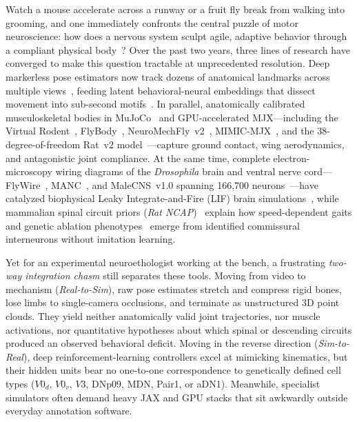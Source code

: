 \documentclass[10pt,twocolumn,letterpaper]{article}
\begin{document}
Watch a mouse accelerate across a runway or a fruit fly break from walking into grooming, and one immediately confronts the central puzzle of motor neuroscience: how does a nervous system sculpt agile, adaptive behavior through a compliant physical body~\cite{krakauer2017neuroscience,datta2019computational}? Over the past two years, three lines of research have converged to make this question tractable at unprecedented resolution. Deep markerless pose estimators now track dozens of anatomical landmarks across multiple views~\cite{mathis2018deeplabcut,pereira2022sleap,dunn2021dannce,karashchuk2021anipose}, feeding latent behavioral-neural embeddings that dissect movement into sub-second motifs~\cite{weinreb2024keypointmoseq,schneider2023cebra}. In parallel, anatomically calibrated musculoskeletal bodies in MuJoCo~\cite{todorov2012mujoco} and GPU-accelerated MJX---including the Virtual Rodent~\cite{aldarondo2024virtualrodent}, FlyBody~\cite{vaxenburg2025flybody}, NeuroMechFly~v2~\cite{wangchen2024neuromechfly2}, MIMIC-MJX~\cite{zhang2025mimicmjx}, and the 38-degree-of-freedom Rat~v2 model~\cite{bhattasali2026ratncap}---capture ground contact, wing aerodynamics, and antagonistic joint compliance. At the same time, complete electron-microscopy wiring diagrams of the \emph{Drosophila} brain and ventral nerve cord---FlyWire~\cite{dorkenwald2024flywire}, MANC~\cite{takemura2024manc}, and MaleCNS~v1.0 spanning 166,700 neurons~\cite{berg2025malecns}---have catalyzed biophysical Leaky Integrate-and-Fire (LIF) brain simulations~\cite{shiu2024drosophilalif}, while mammalian spinal circuit priors (\emph{Rat NCAP})~\cite{bhattasali2022ncap,bhattasali2026ratncap} explain how speed-dependent gaits and genetic ablation phenotypes~\cite{bellardita2015v0,danner2017spinal} emerge from identified commissural interneurons without imitation learning.

Yet for an experimental neuroethologist working at the bench, a frustrating \emph{two-way integration chasm} still separates these tools. Moving from video to mechanism (\emph{Real-to-Sim}), raw pose estimates stretch and compress rigid bones, lose limbs to single-camera occlusions, and terminate as unstructured 3D point clouds. They yield neither anatomically valid joint trajectories, nor muscle activations, nor quantitative hypotheses about which spinal or descending circuits produced an observed behavioral deficit. Moving in the reverse direction (\emph{Sim-to-Real}), deep reinforcement-learning controllers excel at mimicking kinematics, but their hidden units bear no one-to-one correspondence to genetically defined cell types ($V0_d$, $V0_v$, $V3$, DNp09, MDN, Pair1, or aDN1). Meanwhile, specialist simulators often demand heavy JAX and GPU stacks that sit awkwardly outside everyday annotation software.
\end{document}
